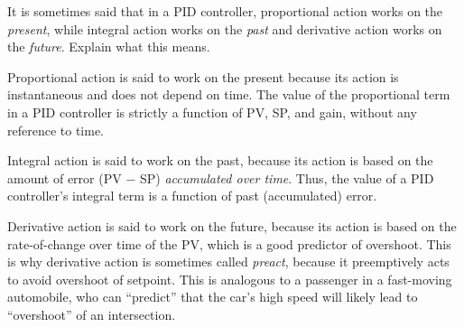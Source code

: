 












It is sometimes said that in a PID controller, proportional action works on the {\it present}, while integral action works on the {\it past} and derivative action works on the {\it future}.  Explain what this means.







Proportional action is said to work on the present because its action is instantaneous and does not depend on time.  The value of the proportional term in a PID controller is strictly a function of PV, SP, and gain, without any reference to time.
 
Integral action is said to work on the past, because its action is based on the amount of error (PV $-$ SP) {\it accumulated over time}.  Thus, the value of a PID controller's integral term is a function of past (accumulated) error.

Derivative action is said to work on the future, because its action is based on the rate-of-change over time of the PV, which is a good predictor of overshoot.  This is why derivative action is sometimes called {\it preact}, because it preemptively acts to avoid overshoot of setpoint.  This is analogous to a passenger in a fast-moving automobile, who can ``predict'' that the car's high speed will likely lead to ``overshoot'' of an intersection.












